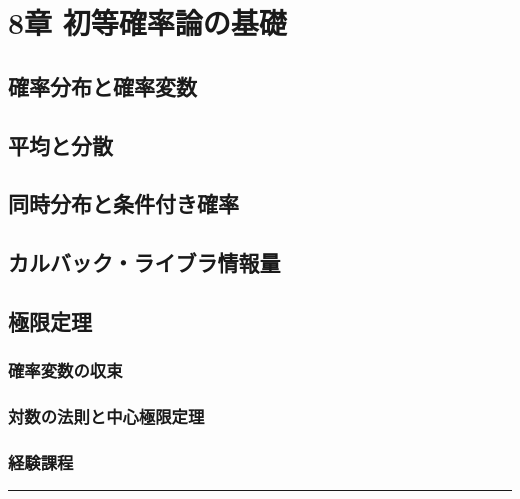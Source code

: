 \section{8章 初等確率論の基礎}
\subsection{確率分布と確率変数}
\subsection{平均と分散}
\subsection{同時分布と条件付き確率}
\subsection{カルバック・ライブラ情報量}
\subsection{極限定理}
\subsubsection{確率変数の収束}
\subsubsection{対数の法則と中心極限定理}
\subsubsection{経験課程}

\noindent\rule{\textwidth}{0.5pt}
